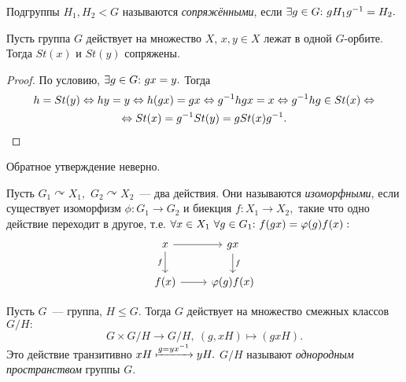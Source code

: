         \begin{definition}
            Подгруппы $H_1, H_2 < G$ называются \textit{сопряжёнными}, если $\exists g \in G{:}{ } \  gH_1g^{-1} = H_2.$
        \end{definition}
        \begin{lemma}
        	Пусть группа $G$ действует на множество $X$, ${x,y \in X}$ лежат в одной $G$-орбите. Тогда $St(x)$ и $St(y)$ сопряжены.
        \end{lemma}
        \begin{proof}
        	По условию, ${\exists g \in G {:}{ } \  gx = y.}$ Тогда
        	\begin{equation*}
        		\begin{gathered}
        			h = St(y) \Leftrightarrow hy = y \Leftrightarrow h(gx) = gx \Leftrightarrow g^{-1}hgx = x \Leftrightarrow g^{-1}hg \in St(x) \Leftrightarrow \\
        			 \Leftrightarrow St(x) = g^{-1}St(y) = gSt(x)g^{-1}. \qedhere
        		\end{gathered}
        	\end{equation*}
        \end{proof}
        \begin{remark}
        	Обратное утверждение неверно.
        \end{remark}
        \begin{definition}
        	Пусть ${G_1 \curvearrowright X_1,}$ ${G_2 \curvearrowright X_2}$~--- два действия. Они называются \textit{изоморфными}, если существует изоморфизм ${\phi : G_1 \rightarrow G_2}$ и биекция ${f : X_1 \rightarrow X_2,}$ такие что одно действие переходит в другое, т.е. ${\forall x \in X_1 \ \forall g \in G_1 {:}{ } \  f(gx) = \varphi(g)f(x):}$
            \[
              \begin{tikzcd}
                x \arrow{r} \arrow[swap]{d}{f} & gx \arrow{d}{f} \\
                 f(x) \arrow{r} & \phi(g)f(x)
              \end{tikzcd}
            \]
        \end{definition}
        \begin{remark}
        	Пусть $G$~--- группа, ${H \leqslant G.}$ Тогда $G$ действует на множество смежных классов ${G/H:}$
        	\begin{equation*}
        		G \times G/H \rightarrow G/H, \ (g,xH) \mapsto (gxH).
        	\end{equation*}
        	Это действие транзитивно ${xH \xmapsto{g = yx^{-1}} yH.}$ \n
        	${G/H}$ называют \textit{однородным пространством} группы $G$.
        	
        \end{remark}
